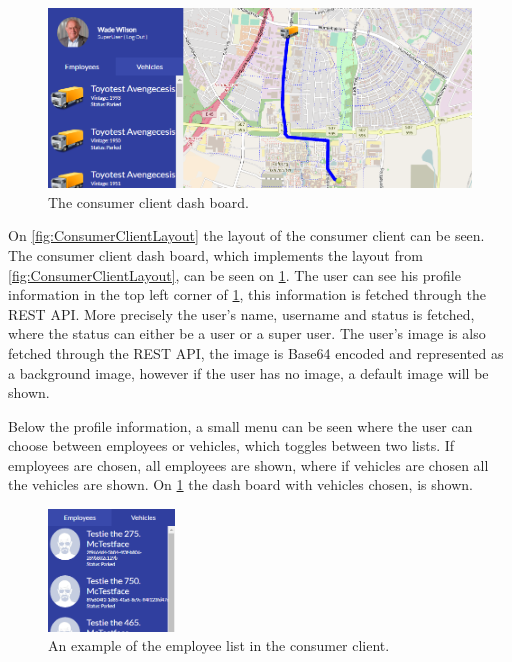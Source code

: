 \begin{figure}[h]
    \centering
    \includegraphics[scale=0.35]{img/consumerClientExample.png}
    \caption{The consumer client dash board.}
    \label{fig:ConsumerClientExample}
\end{figure}

On \cref{fig:ConsumerClientLayout} the layout of the consumer client can be seen.
The consumer client dash board, which implements the layout from \cref{fig:ConsumerClientLayout}, can be seen on \cref{fig:ConsumerClientExample}.
The user can see his profile information in the top left corner of \cref{fig:ConsumerClientExample}, this information is fetched through the REST API.
More precisely the user's name, username and status is fetched, where the status can either be a user or a super user.
The user's image is also fetched through the REST API, the image is Base64 encoded and represented as a background image, however if the user has no image, a default image will be shown.

Below the profile information, a small menu can be seen where the user can choose between employees or vehicles, which toggles between two lists.
If employees are chosen, all employees are shown, where if vehicles are chosen all the vehicles are shown. 
On \cref{fig:ConsumerClientExample} the dash board with vehicles chosen, is shown.

\begin{figure}[h]
    \centering
    \includegraphics[width=0.3\textwidth]{img/displayOfMenuesInConsumerClient.png}
    \caption{An example of the employee list in the consumer client.}
    \label{fig:ConsumerClientMenus}
\end{figure}

